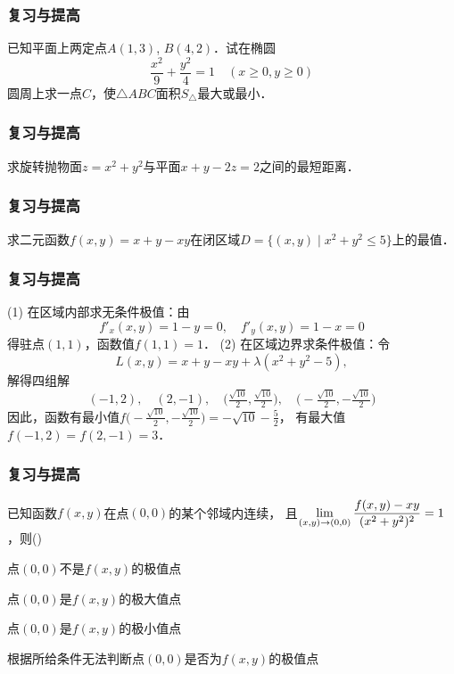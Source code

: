 \documentclass[14pt,notheorems,leqno,xcolor={rgb}]{beamer} %
\begin{document}
\begin{frame}
\frametitle{复习与提高}
\begin{puzzle}
已知平面上两定点$A(1,3)$, $B(4,2)$．试在椭圆
$$\dfrac{x^2}{9}+\dfrac{y^2}{4}=1\quad (x\ge0,y\ge0)$$
圆周上求一点$C$，使$\triangle ABC$面积$S_{\triangle}$最大或最小．
\end{puzzle}
\end{frame}

\begin{frame}
\frametitle{复习与提高}
\begin{puzzle}
求旋转抛物面$z=x^2+y^2$与平面$x+y-2z=2$之间的最短距离．
\end{puzzle}
\end{frame}

\begin{frame}
\frametitle{复习与提高}
\begin{puzzle}
求二元函数$f(x,y)=x+y-xy$在闭区域$D=\{(x,y)\mid x^2+y^2\le5\}$上的最值．
\end{puzzle}
\end{frame}

\begin{sframe}
\frametitle{复习与提高}
\vspace{-0.3em}\begin{solution}
(1) 在区域内部求无条件极值：由
\[ f'_x(x,y)=1-y=0,\quad f'_y(x,y)=1-x=0 \]
得驻点$(1,1)$，函数值$f(1,1)=1$．\ppause
(2) 在区域边界求条件极值：令
$$L(x,y)=x+y-xy+\lambda(x^2+y^2-5),$$
解得四组解\vspace{-0.3em}
\[ 
(-1,2),\quad (2,-1),\quad 
\big(\tfrac{\sqrt{10}}{2},\tfrac{\sqrt{10}}{2}\big),\quad
\big(-\tfrac{\sqrt{10}}{2},-\tfrac{\sqrt{10}}{2}\big)
\]%
因此，函数有最小值$f\big(-\tfrac{\sqrt{10}}{2},-\tfrac{\sqrt{10}}{2}\big)=-\sqrt{10}-\frac{5}{2}$，
有最大值$f(-1,2)=f(2,-1)=3$．
\end{solution}
\end{sframe}

\begin{frame}
\frametitle{复习与提高}
\begin{choice}
已知函数$f(x,y)$在点$(0,0)$的某个邻域内连续，
且$\lim\limits_{(x,y)\to(0,0)}\dfrac{f(x,y)-xy}{(x^2+y^2)^2}=1$，则\dotfill()
\begin{choiceline}
  \item 点$(0,0)$不是$f(x,y)$的极值点
  \item 点$(0,0)$是$f(x,y)$的极大值点
  \item 点$(0,0)$是$f(x,y)$的极小值点
  \item 根据所给条件无法判断点$(0,0)$是否为$f(x,y)$的极值点
\end{choiceline} 
\end{choice}
\end{frame}
\end{document}
